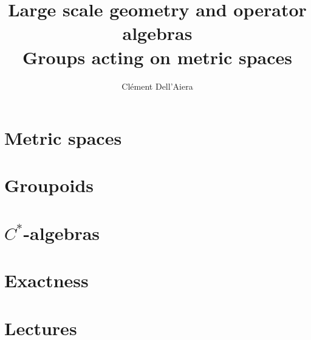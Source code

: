 \documentclass[a4paper,12pt]{book}
\title{\textbf{Large scale geometry and operator algebras}\\
Groups acting on metric spaces}
\date{}
\author{ Clément Dell'Aiera}
\begin{document}
\maketitle

\pagestyle{plain}
\tableofcontents

\pagestyle{fancy}
\chapter{Metric spaces}


\chapter{Groupoids}


\chapter{$C^*$-algebras}


\chapter{Exactness}


\chapter{Lectures}


%
% 
\end{document}
